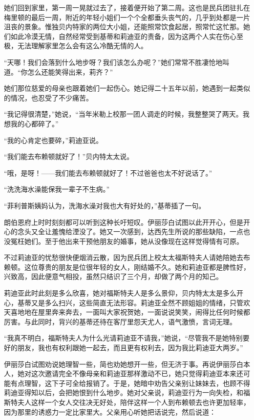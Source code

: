 \par 她们回到家里，第一周一晃就过去了，接着便开始了第二周。这也是民兵团驻扎在梅里顿的最后一周，附近的年轻小姐们一个个全都垂头丧气的，几乎到处都是一片沮丧的景象。惟独贝内特家的两位大小姐，还能照常饮食起居，照常忙这忙那。她们如此冷漠无情，自然经常受到基蒂和莉迪亚的责备，因为这两个人实在伤心至极，无法理解家里怎么会有这么冷酷无情的人。
\par “天哪！我们会落到什么地步呀？我们该怎么办呢？”她们常常不胜凄怆地叫道。“你怎么还能笑得出来，莉齐？”
\par 她们那位慈爱的母亲也跟着她们一起伤心。她记得二十五年以前，她遇到一起类似的情况，也忍受了不少痛苦。
\par “我记得很清楚，”她说，“当年米勒上校那一团人调走的时候，我整整哭了两天。我想我的心都碎了。”
\par “我的心肯定也要碎，”莉迪亚说。
\par “我们能去布赖顿就好了！”贝内特太太说。
\par “哦，是呀！——我们能去布赖顿就好了！不过爸爸也太不好说话了。”
\par “洗洗海水澡能保我一辈子不生病。”
\par “菲利普斯姨妈认为，洗海水澡对我也大有好处的，”基蒂插了一句。
\par 朗伯恩府上时时刻刻都可以听到这种长吁短叹。伊丽莎白试图以此开开心，但是开心的念头又全让羞愧给湮没了。她又一次感到，达西先生所说的那些缺陷，一点也没冤枉她们。至于他出来干预他朋友的婚事，她从没像现在这样觉得情有可原。
\par 不过莉迪亚的忧愁很快便烟消云散，因为民兵团上校太太福斯特夫人请她陪她去布赖顿。这位尊贵的朋友是位很年轻的女人，刚结婚不久。她和莉迪亚都是脾性好，兴致高，因此便意气相投，虽然只结识了三个月，却做了两个月的知己。
\par 莉迪亚此时此刻是多么欣喜，她对福斯特夫人是多么景仰，贝内特太太是多么开心，基蒂又是多么扫兴，这些简直无法形容。莉迪亚全然不顾姐姐的情绪，只管欢天喜地地在屋里奔来奔去，一面叫大家祝贺她，一面说说笑笑，闹得比任何时候都厉害。与此同时，背兴的基蒂还待在客厅里怨天尤人，语气激愤，言词无理。
\par “我真不明白，福斯特夫人为什么光请莉迪亚不请我，”她说，“尽管我不是她特别要好的朋友，我也有权利跟她一起去，而且更有权利去，因为我比莉迪亚大两岁。”
\par 伊丽莎白试图劝说她理智一些，简也劝她想开一些，但无济于事。再说伊丽莎白本人，她对这次邀请完全不像母亲和莉迪亚那样激动不已，她只觉得莉迪亚本来还可能有点理智，这下子可全给报销了。于是，她暗中劝告父亲别让妹妹去，也顾不得莉迪亚得知以后，会把她恨到什么地步。她对父亲说，莉迪亚行为一向失检，和福斯特夫人这样一个女人交往决无好处，陪伴这样一个人到布赖顿去也许更加轻率，因为那里的诱惑力一定比家里大。父亲用心听她把话说完，然后说道：
